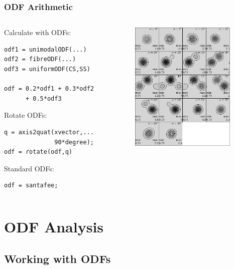 \documentclass{beamer}
\begin{document}
\begin{frame}[fragile]
  \frametitle{ODF Arithmetic}


  \begin{columns}
    \begin{column}{6cm}
        
      Calculate with ODFs:
\begin{lstlisting}
odf1 = unimodalODF(...)
odf2 = fibreODF(...)
odf3 = uniformODF(CS,SS)

odf = 0.2*odf1 + 0.3*odf2 
      + 0.5*odf3 

\end{lstlisting}
  
  Rotate ODFs:
\begin{lstlisting}
q = axis2quat(xvector,...
              90*degree);
odf = rotate(odf,q)       
\end{lstlisting}


  Standard ODFs:
\begin{lstlisting}
odf = santafee; 
\end{lstlisting}

        
\end{column}
\begin{column}{5cm}
  \includegraphics[width=5cm]{pic/santafeeh}
\end{column}
\end{columns}    

\end{frame}

\section*{ODF Analysis}

\subsection*{Working with ODFs}
\end{document}
